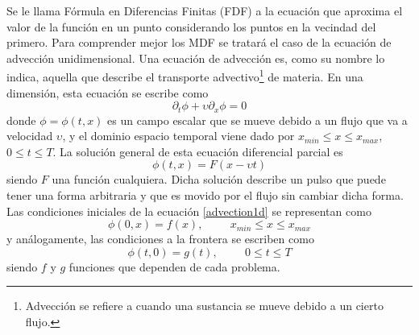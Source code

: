 \documentclass[11pt,twoside,openright,spanish]{report}
\numberwithin{equation}{chapter}
\numberwithin{figure}{chapter}
\numberwithin{table}{chapter}
\begin{document}
Se le llama Fórmula en Diferencias Finitas (FDF) a la ecuación que aproxima el valor de la función en un punto considerando los puntos en la vecindad del primero. Para comprender mejor los MDF se tratará el caso de la ecuación de advección unidimensional. Una ecuación de advección es, como su nombre lo indica, aquella que describe el transporte advectivo\footnote{Advección se refiere a cuando una sustancia se mueve debido a un cierto flujo.} de materia. En una dimensión, esta ecuación se escribe como
\begin{equation}
\partial_t\phi+\upsilon\partial_x \phi=0
\label{advection1d}
\end{equation}
donde $\phi=\phi(t,x)$ es un campo escalar que se mueve debido a un flujo que va a velocidad $\upsilon$, y el dominio espacio temporal viene dado por $x_{min}\leq x\leq x_{max}$, $0\leq t\leq T$. La solución general de esta ecuación diferencial parcial es
\begin{equation}
\phi(t,x)=F(x-\upsilon t)
\end{equation}
siendo $F$ una función cualquiera. Dicha solución describe un pulso que puede tener una forma arbitraria y que es movido por el flujo sin cambiar dicha forma. Las condiciones iniciales de la ecuación \eqref{advection1d} se representan como
\begin{equation}
\phi(0,x)=f(x),\hspace{1cm} x_{min}\leq x\leq x_{max}
\end{equation}
y análogamente, las condiciones a la frontera se escriben como
\begin{equation}
\phi(t,0)=g(t),\hspace{1cm} 0\leq t\leq T
\end{equation}
siendo $f$ y $g$ funciones que dependen de cada problema.
\end{document}
